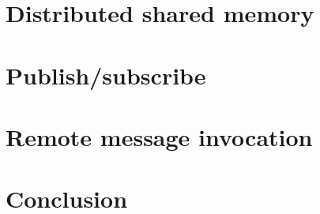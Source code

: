 
\section{Distributed shared memory}




\section{Publish/subscribe}


\section{Remote message invocation}


\section{Conclusion}

